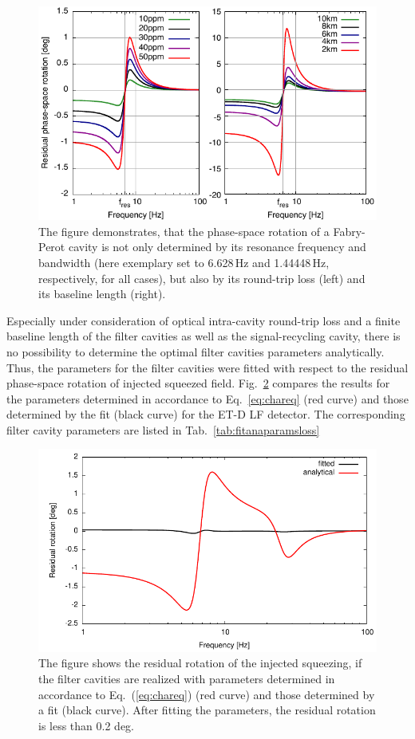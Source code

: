  \begin{figure}
 \centering
   \includegraphics{./Sec_Optics/PhsRot-residualsAI.pdf}
   \caption{The figure demonstrates, that the phase-space rotation of a Fabry-Perot cavity is not only determined by its resonance frequency and bandwidth (here exemplary set to 6.628\,Hz and 1.44448\,Hz, respectively, for all cases), but also by its round-trip loss (left) and its baseline length (right).}
   \label{fig:phs-vs-loss}
   \end{figure}


Especially under consideration of optical intra-cavity round-trip loss and a finite baseline length of the filter cavities as well as the signal-recycling cavity,
there is no possibility to determine the optimal filter cavities parameters analytically. Thus, the parameters for the filter cavities were fitted with respect to the residual phase-space rotation of injected squeezed field. Fig.~\ref{fig:phs-fit-75ppm} compares the results for the parameters determined in accordance to Eq.~\ref{eq:chareq} (red curve) and those determined by the fit (black curve) for the ET-D LF detector. The corresponding filter cavity parameters are listed in Tab.~\ref{tab:fitanaparamsloss}

\begin{figure}
 \centering
   \includegraphics{./Sec_Optics/Fit_realparams.pdf}
   \caption{The figure shows the residual rotation of the injected squeezing, if the filter cavities are realized with parameters determined in accordance to Eq.~(\ref{eq:chareq}) (red curve) and those determined by  a fit (black curve). After fitting the parameters, the residual rotation is less than 0.2 deg.}
   \label{fig:phs-fit-75ppm}
   \end{figure}


